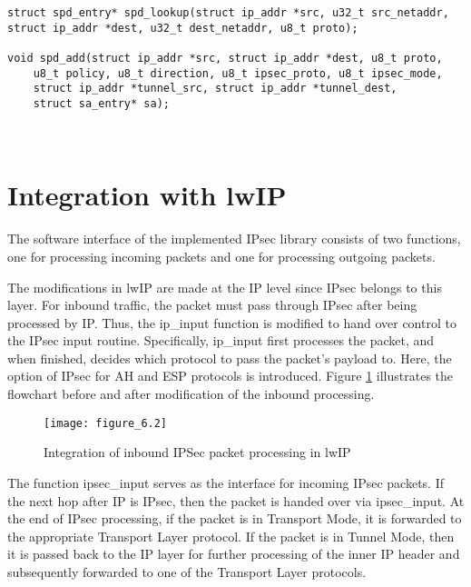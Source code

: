 \noindent
\begin{minipage}{\linewidth}
\begin{lstlisting}[style=mycodestyle, label={lst:spd_interface}, caption={The SPD interface}]
struct spd_entry* spd_lookup(struct ip_addr *src, u32_t src_netaddr, 
struct ip_addr *dest, u32_t dest_netaddr, u8_t proto);
	
void spd_add(struct ip_addr *src, struct ip_addr *dest, u8_t proto, 
    u8_t policy, u8_t direction, u8_t ipsec_proto, u8_t ipsec_mode,
    struct ip_addr *tunnel_src, struct ip_addr *tunnel_dest,
    struct sa_entry* sa);
\end{lstlisting}
\end{minipage}\\


\section{Integration with lwIP}
The software interface of the implemented IPsec library consists of two functions, one for processing incoming packets and one for processing outgoing packets.

The modifications in lwIP are made at the IP level since IPsec belongs to this layer. For inbound traffic, the packet must pass through IPsec after being processed by IP. Thus, the ip\_input function is modified to hand over control to the IPsec input routine. Specifically, ip\_input first processes the packet, and when finished, decides which protocol to pass the packet's payload to. Here, the option of IPsec for AH and ESP protocols is introduced. Figure \ref{fig:figure_6.2} illustrates the flowchart before and after modification of the inbound processing.

\begin{figure}
\centering
\texttt{[image: figure\_6.2]}\\
\caption{  Integration of inbound IPSec packet processing in lwIP }
\label{fig:figure_6.2}
\end{figure}

The function ipsec\_input serves as the interface for incoming IPsec packets. If the next hop after IP is IPsec, then the packet is handed over via ipsec\_input. At the end of IPsec processing, if the packet is in Transport Mode, it is forwarded to the appropriate Transport Layer protocol. If the packet is in Tunnel Mode, then it is passed back to the IP layer for further processing of the inner IP header and subsequently forwarded to one of the Transport Layer protocols.

